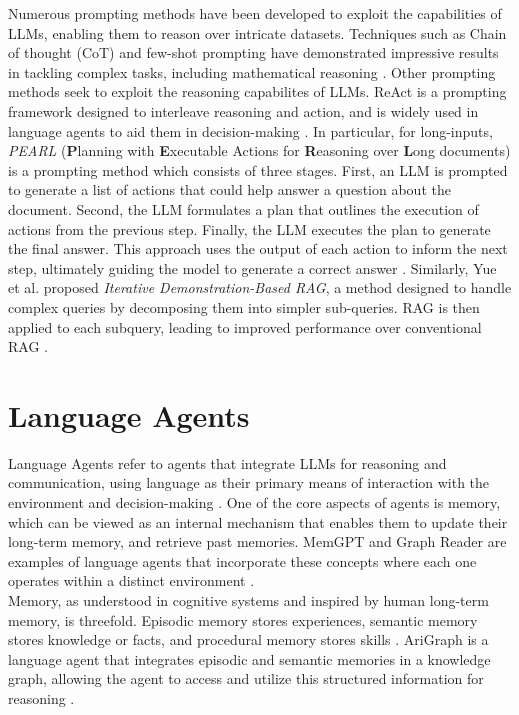Numerous prompting methods have been developed to exploit the capabilities of LLMs, enabling them to reason over intricate datasets. Techniques such as Chain of thought (CoT) and few-shot prompting have demonstrated impressive results in tackling complex tasks, including mathematical reasoning \cite{wei2023chainofthoughtpromptingelicitsreasoning}. Other prompting methods seek to exploit the reasoning capabilites of LLMs. ReAct is a prompting framework designed to interleave reasoning and action, and is widely used in language agents to aid them in decision-making \cite{yao2022react}. In particular, for long-inputs, \textit{PEARL} (\textbf{P}lanning with \textbf{E}xecutable Actions for \textbf{R}easoning over \textbf{L}ong documents) is a prompting method which consists of three stages. First, an LLM is prompted to generate a list of actions that could help answer a question about the document. Second, the LLM formulates a plan that outlines the execution of actions from the previous step. Finally, the LLM executes the plan to generate the final answer. This approach uses the output of each action to inform the next step, ultimately guiding the model to generate a correct answer \cite{sun-etal-2024-pearl}. Similarly, Yue et al. proposed \textit{Iterative Demonstration-Based RAG}, a method designed to handle complex queries by decomposing them into simpler sub-queries. RAG is then applied to each subquery, leading to improved performance over conventional RAG \cite{yue2024inferencescalinglongcontextretrieval}.

\section{Language Agents}

Language Agents refer to agents that integrate LLMs for reasoning and communication, using language as their primary means of interaction with the environment and decision-making \cite{language-agent-tutorial}. One of the core aspects of agents is memory, which can be viewed as an internal mechanism that enables them to update their long-term memory, and retrieve past memories. MemGPT and Graph Reader are examples of language agents that incorporate these concepts where each one operates within a distinct environment \cite{packer2024memgptllmsoperatingsystems}\cite{li2024graphreaderbuildinggraphbasedagent}.\\

\noindent Memory, as understood in cognitive systems and inspired by human long-term memory, is threefold. Episodic memory stores experiences, semantic memory stores knowledge or facts, and procedural memory stores skills \cite{sumers2024cognitive}. AriGraph is a language agent that integrates episodic and semantic memories in a knowledge graph, allowing the agent to access and utilize this structured information for reasoning \cite{anokhin2024arigraphlearningknowledgegraph}.

